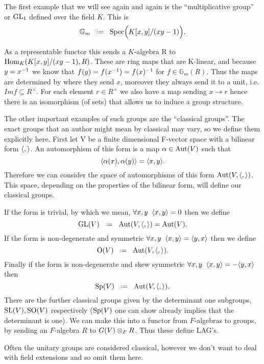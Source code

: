 \begin{example}[\(\mathbb{G}_m\)]
    The first example that we will see again and again is the ``multiplicative group'' or \(\operatorname{GL}_1\) defined over the field \(K\). This is 
    \[\mathbb{G}_m \defeq \Spec\Bigl( K[x,y]/(xy - 1)\Bigr).\]

    As a representable functor this sends a \(K\)-algebra R to \(\operatorname{Hom}_K(K[x,y]/(xy - 1), R)\). These are ring maps that are K-linear, and  because \(y = x^{-1}\) we know that \(f(y) = f(x^{-1}) = f(x)^{-1}\) for \(f\in \mathbb{G}_m(R)\). Thus the maps are determined by where they send \(x\), moreover they always send it to a unit, i.e. \(Im f \subseteq R^\times\). For each element \(r\in R^\times\) we also have a map sending \(x\to r\) hence there is an isomorphism (of sets) that allows us to induce a group structure. 
\end{example}

The other important examples of such groups are the ``classical groups''. The exact groups that an author might mean by classical may vary, so we define them explicitly here. First let V be a finite dimensional F-vector space with a bilinear form \(\langle ,\rangle\). An automorphism of this form is a map \(\alpha\in \operatorname{Aut}(V)\) such that 
\[\langle \alpha(x), \alpha(y)\rangle = \langle x,y\rangle.\]
Therefore we can consider the space of automorphisms of this form \(\operatorname{Aut}(V, \langle ,\rangle)\). This space, depending on the properties of the bilinear form, will define our classical groups. 

If the form is trivial, by which we mean, \(\forall x,y \;\; \langle x, y\rangle = 0\) then we define 
\[\GL(V) \defeq \Aut(V, \inner{,}) = \Aut(V).\]
If the form is non-degenerate and symmetric \(\forall x,y \;\; \langle x, y\rangle = \langle y,x\rangle\) then we define
\[\mathrm{O}(V) \defeq \Aut(V, \inner{,}).\]
Finally if the form is non-degenerate and skew symmetric \(\forall x,y \;\; \langle x, y\rangle = -\langle y,x\rangle\) then 
\[\Sp(V) \defeq \Aut(V, \inner{,}).\]
There are the further classical groups given by the determinant one subgroups, \(\operatorname{SL}(V), \mathrm{SO}(V)\) respectively (\(\operatorname{Sp}(V)\) one can show already implies that the determinant is one). We can make this into a functor from \(F\)-algebras to groups, by sending an \(F\)-algebra \(R\) to \(G(V)\otimes_F R\). Thus these define LAG's. 

\begin{remark}
    Often the unitary groups are considered classical, however we don't want to deal with field extensions and so omit them here. 
\end{remark}

